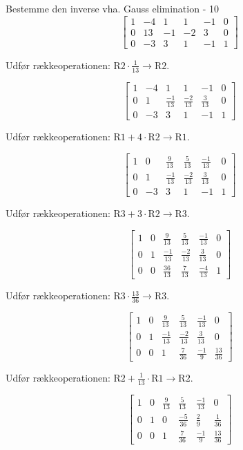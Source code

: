 \documentclass{article}
\begin{document}
\begin{exercise}{Bestemme den inverse vha. Gauss elimination - 10}
\hint
\[
\left[\begin{array}{ccc|ccc}
1 & -4 & 1 & 1 & -1 & 0 \\
0 & 13 & -1 & -2 & 3 & 0 \\
0 & -3 & 3 & 1 & -1 & 1
\end{array} \right]
\]

\hint
Udfør rækkeoperationen: $\text{R2} \cdot \frac{1}{13} \to \text{R2}$.

\hint
\[
\left[\begin{array}{ccc|ccc}
1 & -4 & 1 & 1 & -1 & 0 \\
0 & 1 & \frac{-1}{13} & \frac{-2}{13} & \frac{3}{13} & 0 \\
0 & -3 & 3 & 1 & -1 & 1
\end{array} \right]
\]

\hint
Udfør rækkeoperationen: $\text{R1} + 4 \cdot \text{R2} \to \text{R1}$.

\hint
\[
\left[\begin{array}{ccc|ccc}
1 & 0 & \frac{9}{13} & \frac{5}{13} & \frac{-1}{13} & 0 \\
0 & 1 & \frac{-1}{13} & \frac{-2}{13} & \frac{3}{13} & 0 \\
0 & -3 & 3 & 1 & -1 & 1
\end{array} \right]
\]

\hint
Udfør rækkeoperationen: $\text{R3} + 3 \cdot \text{R2} \to \text{R3}$.

\hint
\[
\left[\begin{array}{ccc|ccc}
1 & 0 & \frac{9}{13} & \frac{5}{13} & \frac{-1}{13} & 0 \\
0 & 1 & \frac{-1}{13} & \frac{-2}{13} & \frac{3}{13} & 0 \\
0 & 0 & \frac{36}{13} & \frac{7}{13} & \frac{-4}{13} & 1
\end{array} \right]
\]

\hint
Udfør rækkeoperationen: $\text{R3} \cdot \frac{13}{36} \to \text{R3}$.

\hint
\[
\left[\begin{array}{ccc|ccc}
1 & 0 & \frac{9}{13} & \frac{5}{13} & \frac{-1}{13} & 0 \\
0 & 1 & \frac{-1}{13} & \frac{-2}{13} & \frac{3}{13} & 0 \\
0 & 0 & 1 & \frac{7}{36} & \frac{-1}{9} & \frac{13}{36}
\end{array} \right]
\]

\hint
Udfør rækkeoperationen: $\text{R2} + \frac{1}{13} \cdot \text{R1} \to \text{R2}$.

\hint
\[
\left[\begin{array}{ccc|ccc}
1 & 0 & \frac{9}{13} & \frac{5}{13} & \frac{-1}{13} & 0 \\
0 & 1 & 0 & \frac{-5}{36} & \frac{2}{9} & \frac{1}{36} \\
0 & 0 & 1 & \frac{7}{36} & \frac{-1}{9} & \frac{13}{36}
\end{array} \right]
\]


\end{exercise}
\end{document}
